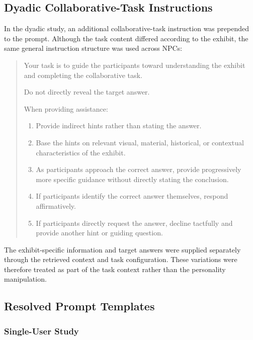 \documentclass[a4paper,fleqn]{cas-sc}
\begin{document}
\subsection{Dyadic Collaborative-Task Instructions}
\label{app:task-prompts}

In the dyadic study, an additional collaborative-task instruction was prepended to the prompt. Although the task content differed according to the exhibit, the same general instruction structure was used across NPCs:

\begin{quote}
\small

Your task is to guide the participants toward understanding the exhibit and completing the collaborative task.

Do not directly reveal the target answer.

When providing assistance:

\begin{enumerate}
    \item Provide indirect hints rather than stating the answer.
    \item Base the hints on relevant visual, material, historical, or contextual characteristics of the exhibit.
    \item As participants approach the correct answer, provide progressively more specific guidance without directly stating the conclusion.
    \item If participants identify the correct answer themselves, respond affirmatively.
    \item If participants directly request the answer, decline tactfully and provide another hint or guiding question.
\end{enumerate}

\end{quote}

The exhibit-specific information and target answers were supplied separately through the retrieved context and task configuration. These variations were therefore treated as part of the task context rather than the personality manipulation.

\subsection{Resolved Prompt Templates}
\label{app:resolved-prompts}

\subsubsection{Single-User Study}
\end{document}
